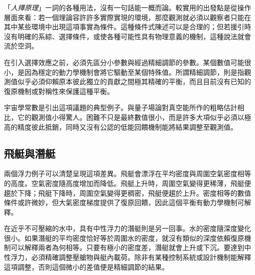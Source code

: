 「\emph{人擇原理}」一詞的各種用法，沒有一句話能一概而論。較實用的出發點是從操作層面來看：若一個理論容許許多實際實現的環境，那麼觀測就必須以觀察者只能在其中某些環境中出現這項事實為條件。這種條件式陳述可以是合理的；但若援引時沒有明確的系綜、選擇條件，或使各種可能性具有物理意義的機制，這種說法就會流於空洞。

在引入選擇效應之前，必須先區分小參數與經過精細調節的參數。某個數值可能很小，是因為穩定的動力學機制會將它驅動至某個特殊值。所謂精細調節，則是指觀測值似乎必須仰賴原本彼此獨立的貢獻之間極其精確的平衡，而且目前沒有已知的復原機制或對稱性來保護這種平衡。

\begin{classroomqa}
\end{classroomqa}

宇宙學常數是引出這項議題的典型例子。與量子場論對真空能所作的粗略估計相比，它的觀測值小得驚人。困難不只是最終數值很小，而是許多大項似乎必須以極高的精度彼此抵銷，同時又沒有公認的低能回饋機制能將結果調整至觀測值。

\subsection{飛艇與潛艇}

兩個浮力例子可以清楚呈現這項差異。飛艇會漂浮在平均密度與周圍空氣密度相等的高度。空氣密度隨高度增加而降低。飛艇上升時，周圍空氣變得更稀薄，飛艇便趨於下降；飛艇下降時，周圍空氣變得更稠密，飛艇便趨於上升。密度相等的數值條件或許微妙，但大氣密度梯度提供了復原回饋，因此這個平衡有動力學機制可解釋。

在近乎不可壓縮的水中，具有中性浮力的潛艇則是另一回事。水的密度隨深度變化很小。如果潛艇的平均密度恰好等於周圍水的密度，就沒有類似的深度依賴復原機制可以解釋兩者為何相等。只要有極小的密度差，潛艇就會上升或下沉。要達到中性浮力，必須精確調整壓艙物與艇內載荷。除非有某種控制系統或設計機制能解釋這項調整，否則這個微小的差值便是精細調節的結果。

